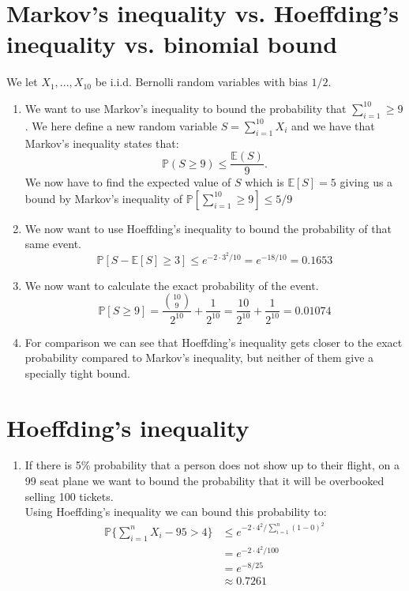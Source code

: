 \documentclass[a4paper]{article}
\def\E{\mathbb{E}}
\def\P{\mathbb{P}}
\begin{document}
\section{Markov's inequality vs. Hoeffding's inequality vs. binomial bound}
We let $X_1,...,X_{10}$ be i.i.d. Bernolli random variables with bias $1/2$.
\begin{enumerate}
  \item We want to use Markov's inequality to bound the probability that $\sum^{10}_{i=1} \geq 9$. We here define a new random variable $S = \sum^{10}_{i=1} X_i$ and we have that Markov's inequality states that:
    $$
    \mathbb{P}(S \geq 9) \leq \frac{\mathbb{E}(S)}{9}.
    $$
    We now have to find the expected value of $S$ which is $\E[S] = 5$ giving us a bound by Markov's inequality of
    $\P[\sum^{10}_{i=1} \geq 9] \leq 5/9$
  \item We now want to use Hoeffding's inequality to bound the probability of that same event.
    $$
    \mathbb{P}[S - \E[S] \geq 3] \leq e^{-2 \cdot 3^2 / 10} = e^{-18/10} = 0.1653
    $$
  \item We now want to calculate the exact probability of the event.
    $$
    \P[S \geq 9] = \frac{\binom{10}{9}}{2^{10}} + \frac{1}{2^{10}} = \frac{10}{2^{10}} + \frac{1}{2^{10}} = 0.01074
    $$
  \item For comparison we can see that Hoeffding's inequality gets closer to the exact probability compared to Markov's inequality, but neither of them give a specially tight bound.
\end{enumerate}
\section{Hoeffding's inequality}
\begin{enumerate}
  \item If there is 5\% probability that a person does not show up to their flight, on a 99 seat plane we want to bound the probability that it will be overbooked selling 100 tickets.\\
  Using Hoeffding's inequality we can bound this probability to:
  \begin{align*}
    \mathbb{P}\{\sum_{i=1}^nX_i-95 > 4\}&\leq e^{-2\cdot 4^2/\sum_{i=1}^n(1-0)^2} \\
    &= e^{-2\cdot 4^2/100} \\
    &= e^{-8/25}\\
    &\approx 0.7261
  \end{align*}
\end{enumerate}
\end{document}
